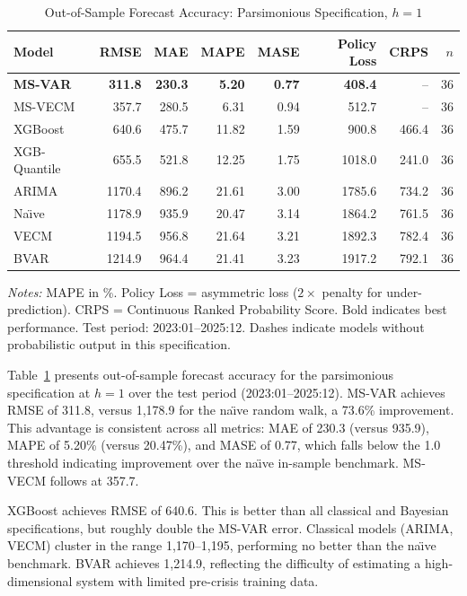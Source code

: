 \documentclass[12pt,a4paper]{article}
\begin{document}
\begin{table}[htbp]
\centering
\caption{Out-of-Sample Forecast Accuracy: Parsimonious Specification, $h = 1$}
\label{tab:main_accuracy}
\begin{tabular}{lrrrrrrr}
\toprule
Model & RMSE & MAE & MAPE & MASE & Policy Loss & CRPS & $n$ \\
\midrule
\textbf{MS-VAR} & \textbf{311.8} & \textbf{230.3} & \textbf{5.20} & \textbf{0.77} & \textbf{408.4} & -- & 36 \\
MS-VECM & 357.7 & 280.5 & 6.31 & 0.94 & 512.7 & -- & 36 \\
XGBoost & 640.6 & 475.7 & 11.82 & 1.59 & 900.8 & 466.4 & 36 \\
XGB-Quantile & 655.5 & 521.8 & 12.25 & 1.75 & 1018.0 & 241.0 & 36 \\
ARIMA & 1170.4 & 896.2 & 21.61 & 3.00 & 1785.6 & 734.2 & 36 \\
Na\"{\i}ve & 1178.9 & 935.9 & 20.47 & 3.14 & 1864.2 & 761.5 & 36 \\
VECM & 1194.5 & 956.8 & 21.64 & 3.21 & 1892.3 & 782.4 & 36 \\
BVAR & 1214.9 & 964.4 & 21.41 & 3.23 & 1917.2 & 792.1 & 36 \\
\bottomrule
\end{tabular}
\begin{tablenotes}
\small
\item \textit{Notes:} MAPE in \%. Policy Loss = asymmetric loss ($2\times$ penalty for under-prediction). CRPS = Continuous Ranked Probability Score. Bold indicates best performance. Test period: 2023:01--2025:12. Dashes indicate models without probabilistic output in this specification.
\end{tablenotes}
\end{table}

Table~\ref{tab:main_accuracy} presents out-of-sample forecast accuracy for the parsimonious specification at $h=1$ over the test period (2023:01--2025:12). MS-VAR achieves RMSE of 311.8, versus 1,178.9 for the na\"{\i}ve random walk, a 73.6\% improvement. This advantage is consistent across all metrics: MAE of 230.3 (versus 935.9), MAPE of 5.20\% (versus 20.47\%), and MASE of 0.77, which falls below the 1.0 threshold indicating improvement over the na\"{\i}ve in-sample benchmark. MS-VECM follows at 357.7.

XGBoost achieves RMSE of 640.6. This is better than all classical and Bayesian specifications, but roughly double the MS-VAR error. Classical models (ARIMA, VECM) cluster in the range 1,170--1,195, performing no better than the na\"{\i}ve benchmark. BVAR achieves 1,214.9, reflecting the difficulty of estimating a high-dimensional system with limited pre-crisis training data.
\end{document}
